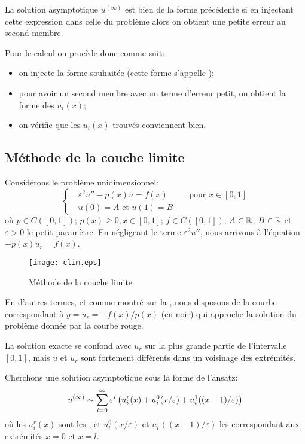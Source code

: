 \medskip
La solution asymptotique $u^{(\infty)}$ est bien de la forme précédente si en injectant
cette expression dans celle du problème alors on obtient une petite erreur au second membre.

\medskip
Pour le calcul on procède donc comme suit:
\begin{itemize}
   \item on injecte la forme souhaitée (cette forme s'appelle );
   \item pour avoir un second membre avec un terme d'erreur petit, on obtient la forme des $u_i(x)$;
   \item on vérifie que les $u_i(x)$ trouvés conviennent bien.
\end{itemize}


\medskip
\subsection{Méthode de la couche limite}
Considérons le problème unidimensionnel:
\begin{equation}
\left\{
\begin{aligned}
&\varepsilon^2u''-p(x)u= f(x) &&\text{ pour } x\in[0,1]\\
&u(0)=A \text{ et } u(1)=B
\end{aligned}
\right.
\end{equation}
où $p\in C([0,1])$; $p(x)\ge0, x\in[0,1]$; $f\in C([0,1])$; $A\in\mathbb R$, $B\in\mathbb R$ et
$\varepsilon>0$ le petit paramètre.
En négligeant le terme $\varepsilon^2 u''$, nous arrivons à l'équation $-p(x)u_r=f(x)$.
\begin{figure}[ht]
\centering\texttt{[image: clim.eps]}
\caption{Méthode de la couche limite}\label{Fig-clim}
\end{figure}
En d'autres termes, et comme montré sur la , nous disposons de la
courbe correspondant à $y=u_r=-f(x)/p(x)$ (en noir) qui approche la solution du problème donnée par la courbe rouge.

La solution exacte se confond avec $u_r$ sur la plus grande partie de l'intervalle $[0,1]$,
mais $u$ et $u_r$ sont fortement différents dans un voisinage des extrémités.

\medskip
Cherchons une solution asymptotique sous la forme de l'ansatz:
\begin{equation}
u^{(\infty)} \sim \displaystyle\sum_{i=0}^\infty \varepsilon^i\left( u_i^r(x) + u_i^0(x/\varepsilon)
+u_i^1((x-1)/\varepsilon) \right)
\end{equation}
où les $u_i^r(x)$ sont les , et $u_i^0(x/\varepsilon)$ et
$u_i^1((x-1)/\varepsilon)$ les  correspondant aux
extrémités $x=0$ et $x=l$.

